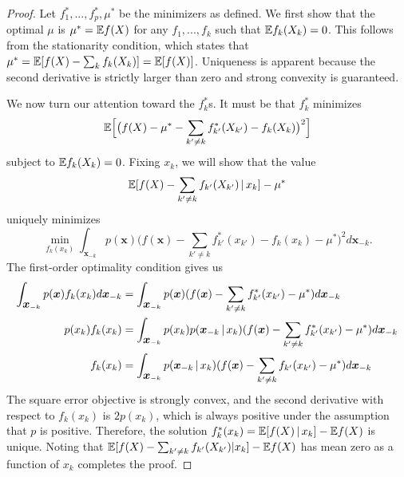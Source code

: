 \begin{proof}
  Let $f^*_1,...,f^*_p, \mu^*$ be the minimizers as defined.  We first
  show that the optimal $\mu$ is $\mu^* = {\mathbb E} f(X)$ for any $f_1, ...,
  f_k$ such that ${\mathbb E} f_k(X_k) = 0$. This follows from the stationarity
  condition, which states that $\mu^* = {\mathbb E}[ f(X) - \sum_k f_k(X_k)] =
  {\mathbb E}[ f(X) ]$. Uniqueness is apparent because the second derivative is
  strictly larger than zero and strong convexity is guaranteed.

  We now turn our attention toward the $f^*_k$s.  It must be that
  $f^*_k$ minimizes 
\begin{equation}
{\mathbb E}\Bigl[ \big( f(X) - \mu^* - \sum_{k' \neq k}
  f^*_{k'} (X_{k'}) - f_k (X_k) \big)^2\Bigr]
\end{equation}
subject to ${\mathbb E} f_k(X_k) = 0$.
Fixing $x_k$, we will show that the value 
\begin{equation}
{\mathbb E}[ f(X) - \sum_{k' \neq k}
f_{k'}(X_{k'}) {\,|\,} x_k] - \mu^*
\end{equation} 
uniquely minimizes
\begin{equation}
\min_{ f_k(x_k) } \int_{\mathbf{x}_{-k}} p(\mathbf{x}) 
         \Big( f(\mathbf{x}) - \sum_{k' \neq k} f^*_{k'} (x_{k'}) - f_k (x_k) -\mu^*\Big)^2 
                 d \mathbf{x}_{-k}.
\end{equation}
The first-order optimality condition gives us
\begin{align}
\int_{\mbox{\boldmath $x$}_{-k}} p(\mbox{\boldmath $x$}) f_k(x_k) d \mbox{\boldmath $x$}_{-k} &= 
  \int_{\mbox{\boldmath $x$}_{-k}} p(\mbox{\boldmath $x$}) 
      ( f(\mbox{\boldmath $x$})-\sum_{k' \neq k} f^*_{k'}(x_{k'})-\mu^*) d \mbox{\boldmath $x$}_{-k} \\  
p(x_k) f_k(x_k) &= \int_{\mbox{\boldmath $x$}_{-k}} p(x_k)
     p(\mbox{\boldmath $x$}_{-k} {\,|\,} x_k ) 
     ( f(\mbox{\boldmath $x$}) - \sum_{k' \neq k} f^*_{k'} (x_{k'})-\mu^*) 
              d \mbox{\boldmath $x$}_{-k} \\
f_k(x_k) &= \int_{\mbox{\boldmath $x$}_{-k}} 
       p(\mbox{\boldmath $x$}_{-k} {\,|\,} x_k ) 
     (f(\mbox{\boldmath $x$}) - \sum_{k'\neq k} f_{k'} (x_{k'})  -\mu^*) d \mbox{\boldmath $x$}_{-k} 
 \end{align}
The square error objective is strongly convex,
and the second derivative with respect to $f_k(x_k)$ is $2 p(x_k)$, which is always positive under the assumption that $p$ is positive. Therefore, the solution $f^*_k(x_k) = {\mathbb E}[ f(X) {\,|\,} x_k ] - {\mathbb E} f(X)$ is unique.
Noting that ${\mathbb E}[ f(X) -\sum_{k'\neq k} f_{k'}(X_{k'}) | x_k] - {\mathbb E} f(X)$ has mean zero as a function of $x_k$
completes the proof.
\end{proof}

